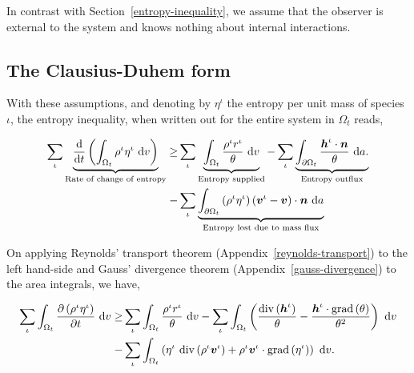 In contrast with Section~\ref{entropy-inequality}, we assume that the
observer is external to the system and knows nothing about internal
interactions. 

\subsection{The Clausius-Duhem form}
\label{eu-clausius-duhem-form}


With these assumptions, and denoting by $\eta^\iota$ the entropy per
unit mass of species~$\iota$, the entropy inequality, when written out
for the entire system in $\Omega_{t}$ reads,

\begin{equation}
\begin{split}
\sum\limits_{\iota} \underbrace{\frac{\mathrm{d}}{\mathrm{d}t}\left(\int_{\Omega_{t}}
  \rho^{\iota} \eta^{\iota}\ \mathrm{d}v \right)}_{\text{Rate of change
    of entropy}} \geq & \sum\limits_{\iota} 
\underbrace{\int_{\Omega_{t}} \frac{ \rho^{\iota}
    r^{\iota}}{\theta}\ \mathrm{d}v}_{\text{Entropy supplied}} - \sum\limits_{\iota} 
\underbrace{\int_{\partial \Omega_{t}}
  \frac{\mbox{\boldmath$ h$}^{\iota}\cdot\mbox{\boldmath$ n$}}{\theta}\ \mathrm{d}a.}_{\text{Entropy outflux}} \\ - &
\sum\limits_{\iota}  \underbrace{\int_{\partial \Omega_{t}} \left(\rho^{\iota} \eta^{\iota}
  \right) \left(\mbox{\boldmath$ v$}^{\iota} - \mbox{\boldmath$ v$}\right) \cdot
  \mbox{\boldmath$ n$}\ \mathrm{d}a}_{\text{Entropy lost due to mass flux}}
\end{split}
\label{eu-globalbalanceofentropy}
\end{equation}

On applying Reynolds' transport theorem
(Appendix~\ref{reynolds-transport}) to the left hand-side and Gauss'
divergence theorem (Appendix~\ref{gauss-divergence}) to the area
integrals, we have,

\begin{equation*}
\begin{split}
\sum\limits_{\iota} \int_{\Omega_{t}}
  \frac{\partial \left(\rho^{\iota} \eta^{\iota}\right) }{\partial t} \ \mathrm{d}v
  \geq & \sum\limits_{\iota}  
\int_{\Omega_{t}} \frac{ \rho^{\iota}
    r^{\iota}}{\theta}\ \mathrm{d}v - \sum\limits_{\iota} 
\int_{\Omega_{t}} \left(
  \frac{\mathrm{div}\left(\bh^{\iota}\right)}{\theta}
- \frac{\bh^{\iota}\cdot\mathrm{grad}\left(\theta\right)}{\theta^{2}}
\right)\ \mathrm{d}v \\ - &
\sum\limits_{\iota} \int_{\Omega_{t}} \left( \eta^{\iota}\ \mathrm{div}
\left(\rho^{\iota}\bv^{\iota} 
  \right) +
  \rho^{\iota}\bv^{\iota}\cdot\mathrm{grad}\left(\eta^{\iota}\right)
  \right)\ \mathrm{d}v.
\end{split}
\end{equation*}

